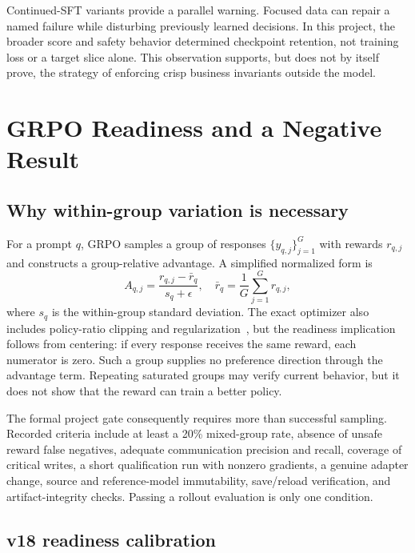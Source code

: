 \documentclass[11pt]{article}
\begin{document}
Continued-SFT variants provide a parallel warning. Focused data can repair a named failure while disturbing previously learned decisions. In this project, the broader score and safety behavior determined checkpoint retention, not training loss or a target slice alone. This observation supports, but does not by itself prove, the strategy of enforcing crisp business invariants outside the model.

\section{GRPO Readiness and a Negative Result}
\label{sec:grpo}

\subsection{Why within-group variation is necessary}

For a prompt $q$, GRPO samples a group of responses $\{y_{q,j}\}_{j=1}^{G}$ with rewards $r_{q,j}$ and constructs a group-relative advantage. A simplified normalized form is
\begin{equation}
  A_{q,j}=\frac{r_{q,j}-\bar r_q}{s_q+\epsilon},
  \quad
  \bar r_q=\frac{1}{G}\sum_{j=1}^{G}r_{q,j},
\label{eq:grpo}
\end{equation}
where $s_q$ is the within-group standard deviation. The exact optimizer also includes policy-ratio clipping and regularization~\citep{schulman2017ppo,shao2024deepseekmath}, but the readiness implication follows from centering: if every response receives the same reward, each numerator is zero. Such a group supplies no preference direction through the advantage term. Repeating saturated groups may verify current behavior, but it does not show that the reward can train a better policy.

The formal project gate consequently requires more than successful sampling. Recorded criteria include at least a 20\% mixed-group rate, absence of unsafe reward false negatives, adequate communication precision and recall, coverage of critical writes, a short qualification run with nonzero gradients, a genuine adapter change, source and reference-model immutability, save/reload verification, and artifact-integrity checks. Passing a rollout evaluation is only one condition.

\subsection{v18 readiness calibration}
\end{document}
